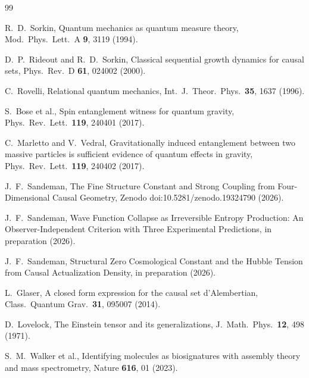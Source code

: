 \documentclass[11pt,twocolumn]{article}
\theoremstyle{plain}
\theoremstyle{remark}
\begin{document}
\begin{thebibliography}{99}

R.~D.~Sorkin,
Quantum mechanics as quantum measure theory,
Mod.\ Phys.\ Lett.\ A \textbf{9}, 3119 (1994).

D.~P.~Rideout and R.~D.~Sorkin,
Classical sequential growth dynamics for causal sets,
Phys.\ Rev.\ D \textbf{61}, 024002 (2000).

C.~Rovelli,
Relational quantum mechanics,
Int.\ J.\ Theor.\ Phys.\ \textbf{35}, 1637 (1996).

S.~Bose et al.,
Spin entanglement witness for quantum gravity,
Phys.\ Rev.\ Lett.\ \textbf{119}, 240401 (2017).

C.~Marletto and V.~Vedral,
Gravitationally induced entanglement between two massive particles
is sufficient evidence of quantum effects in gravity,
Phys.\ Rev.\ Lett.\ \textbf{119}, 240402 (2017).

J.~F.~Sandeman,
The Fine Structure Constant and Strong Coupling from
Four-Dimensional Causal Geometry,
Zenodo doi:10.5281/zenodo.19324790 (2026).

J.~F.~Sandeman,
Wave Function Collapse as Irreversible Entropy Production:
An Observer-Independent Criterion with Three Experimental Predictions,
in preparation (2026).

J.~F.~Sandeman,
Structural Zero Cosmological Constant and the Hubble Tension from
Causal Actualization Density,
in preparation (2026).



L.~Glaser,
A closed form expression for the causal set d'Alembertian,
Class.\ Quantum Grav.\ \textbf{31}, 095007 (2014).

D.~Lovelock,
The Einstein tensor and its generalizations,
J.\ Math.\ Phys.\ \textbf{12}, 498 (1971).

S.~M.~Walker et al.,
Identifying molecules as biosignatures with assembly theory
and mass spectrometry,
Nature \textbf{616}, 01 (2023).

\end{thebibliography}
\end{document}
